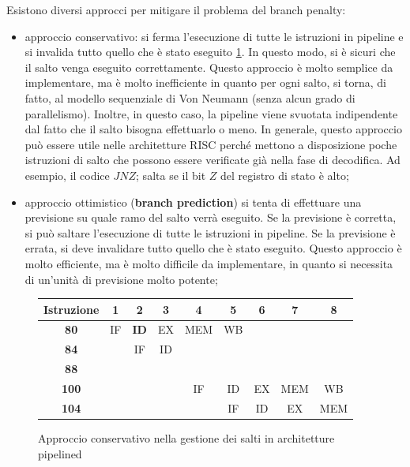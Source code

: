 \documentclass{article}
\begin{document}
Esistono diversi approcci per mitigare il problema del branch penalty:
\begin{itemize}
  \item approccio conservativo: si ferma l'esecuzione di tutte le istruzioni in
    pipeline e si invalida tutto quello che è stato eseguito
    \ref{tab:branch_penalty_cons}. In questo modo, 
    si è sicuri che il salto venga eseguito correttamente. Questo approccio 
    è molto semplice da implementare, ma è molto inefficiente in quanto per 
    ogni salto, si torna, di fatto, al modello sequenziale di Von Neumann 
    (senza alcun grado di parallelismo). Inoltre, in questo caso, la pipeline
    viene svuotata indipendente dal fatto che il salto bisogna effettuarlo o 
    meno. In generale, questo approccio può essere utile nelle architetture 
    RISC perché mettono a disposizione poche istruzioni di salto che possono 
    essere verificate già nella fase di decodifica. Ad esempio, il codice $JNZ$;
    salta se il bit $Z$ del registro di stato è alto;
  \item approccio ottimistico (\textbf{branch prediction}) 
    si tenta di effettuare una previsione su quale ramo del salto verrà eseguito.
    Se la previsione è corretta, si può saltare l'esecuzione di tutte le
    istruzioni in pipeline. Se la previsione è errata, si deve invalidare 
    tutto quello che è stato eseguito. Questo approccio è molto efficiente,
    ma è molto difficile da implementare, in quanto si necessita di un'unità 
    di previsione molto potente;
\end{itemize}

\begin{figure}
  \begin{center}
    \begin{tabular}{|c|c|c|c|c|c|c|c|c|}
      \hline
      \textbf{Istruzione} & \textbf{1} & \textbf{2} & \textbf{3} & \textbf{4} & 
      \textbf{5} & \textbf{6} & \textbf{7}& \textbf{8}\\
      \hline
      \textbf{80} & IF & \textbf{ID} & EX & MEM & WB & & &\\
      \textbf{84} &  & IF & ID & & & & & \\
      \textbf{88} &  &  & &  & & & & \\
      \textbf{100} &  &  &  & IF & ID & EX & MEM & WB \\
      \textbf{104} &  &  &  &  & IF & ID & EX & MEM \\
      \hline
    \end{tabular}
    \caption{Approccio conservativo nella gestione dei salti in architetture 
    pipelined}
    \label{tab:branch_penalty_cons}
  \end{center}
\end{figure}
\end{document}
